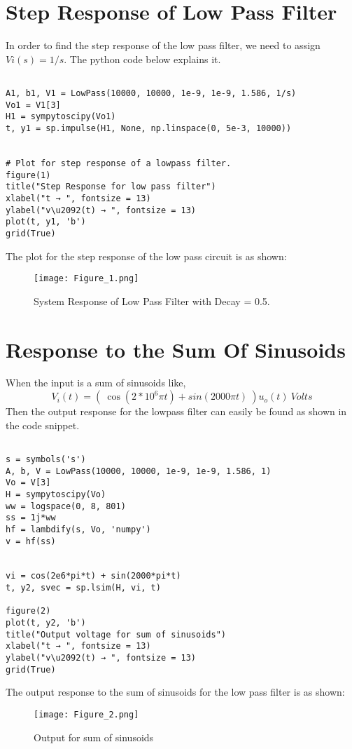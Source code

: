 \documentclass[11pt, a4paper]{article}
\begin{document}
\section*{Step Response of Low Pass Filter}
In order to find the step response of the low pass filter, we need to assign $ Vi(s) = 1/s $. 
The python code below explains it. 
\begin{verbatim}
    
A1, b1, V1 = LowPass(10000, 10000, 1e-9, 1e-9, 1.586, 1/s)
Vo1 = V1[3]
H1 = sympytoscipy(Vo1)
t, y1 = sp.impulse(H1, None, np.linspace(0, 5e-3, 10000))


# Plot for step response of a lowpass filter.
figure(1)
title("Step Response for low pass filter")
xlabel("t → ", fontsize = 13)
ylabel("v\u2092(t) → ", fontsize = 13)
plot(t, y1, 'b')
grid(True)
\end{verbatim}
The plot for the step response of the low pass circuit is as shown:
\begin{figure}[!tbh]
   	\centering
   	\texttt{[image: Figure\_1.png]}
   	\label{fig:32}
   	\caption{System Response of Low Pass Filter with Decay = 0.5.}
   \end{figure}
\section*{Response to the Sum Of Sinusoids}   
    When the input is a sum of sinusoids like,
\begin{equation*}
  V_{i}(t) = ( \ \cos(2*10^{6}\pi t) + sin(2000\pi t)\ )u_{o}(t) \ Volts
  \end{equation*}
  Then the output response for the lowpass filter can easily be found as shown in the code snippet.
\begin{verbatim}
    
s = symbols('s')
A, b, V = LowPass(10000, 10000, 1e-9, 1e-9, 1.586, 1)
Vo = V[3]
H = sympytoscipy(Vo)
ww = logspace(0, 8, 801)
ss = 1j*ww
hf = lambdify(s, Vo, 'numpy')
v = hf(ss)


vi = cos(2e6*pi*t) + sin(2000*pi*t) 
t, y2, svec = sp.lsim(H, vi, t)

figure(2)
plot(t, y2, 'b')
title("Output voltage for sum of sinusoids")
xlabel("t → ", fontsize = 13)
ylabel("v\u2092(t) → ", fontsize = 13)
grid(True)
\end{verbatim}
The output response to the sum of sinusoids for the low pass filter is as shown:
\begin{figure}[!tbh]
   	\centering
   	\texttt{[image: Figure\_2.png]}
   	\label{fig:32}
   	\caption{Output for sum of sinusoids}
   \end{figure}
   \newpage
\end{document}

